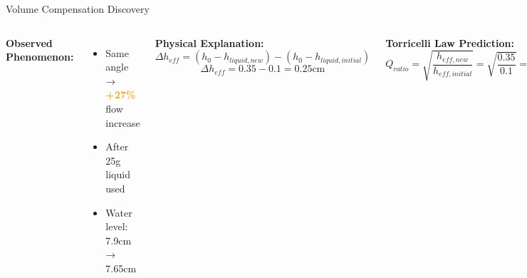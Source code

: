 \documentclass[aspectratio=169]{beamer}
\begin{document}
\begin{frame}{Volume Compensation Discovery}
\begin{columns}[T]
\textbf{Observed Phenomenon:}
\begin{itemize}
    \item Same angle → \textcolor{orange}{\textbf{+27\%}} flow increase
    \item After 25g liquid used
    \item Water level: 7.9cm → 7.65cm
\end{itemize}

\textbf{Physical Explanation:}
\begin{equation}
\Delta h_{eff} = (h_0 - h_{liquid,new}) - (h_0 - h_{liquid,initial})
\end{equation}
\begin{equation}
\Delta h_{eff} = 0.35 - 0.1 = 0.25\text{cm}
\end{equation}

\textbf{Torricelli Law Prediction:}
\begin{equation}
Q_{ratio} = \sqrt{\frac{h_{eff,new}}{h_{eff,initial}}} = \sqrt{\frac{0.35}{0.1}} = 1.87
\end{equation}

\textbf{Dynamic Compensation Algorithm:}
\begin{align}
\text{correction} &= f(\text{water\_used}) \\
\theta_{final} &= \theta_{base} + \text{correction}
\end{align}

\begin{alertblock}{Impact}
Without compensation: ±2.1\% error\\
With compensation: ±0.4\% error
\end{alertblock}
\end{columns}
\end{frame}
\end{document}
